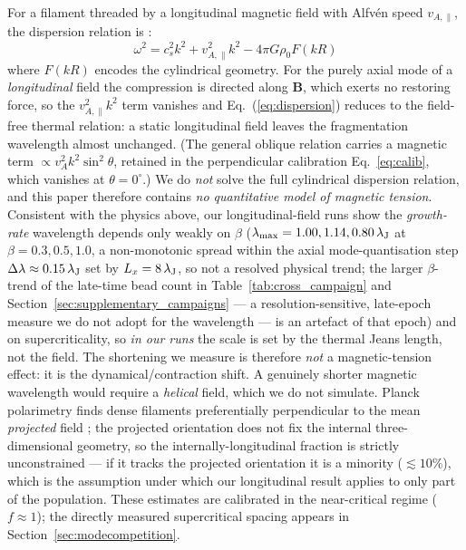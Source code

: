 \documentclass[usenatbib,twoside,twocolumn]{mnras}
\begin{document}
For a filament threaded by a longitudinal magnetic field with Alfv\'en speed $v_{A,\parallel}$, the dispersion relation is \citep{Nakamura1993}:
\begin{equation}
\omega^2 = c_s^2 k^2 + v_{A,\parallel}^2 k^2 - 4\pi G\rho_0 F(kR)
\label{eq:dispersion}
\end{equation}
where $F(kR)$ encodes the cylindrical geometry. For the purely axial mode of a \emph{longitudinal} field the compression is directed along $\mathbf{B}$, which exerts no restoring force, so the $v_{A,\parallel}^2k^2$ term vanishes and Eq.~(\ref{eq:dispersion}) reduces to the field-free thermal relation: a static longitudinal field leaves the fragmentation wavelength almost unchanged. (The general oblique relation carries a magnetic term $\propto v_A^2k^2\sin^2\theta$, retained in the perpendicular calibration Eq.~\ref{eq:calib}, which vanishes at $\theta=0^\circ$.) We do \emph{not} solve the full cylindrical dispersion relation, and this paper therefore contains \emph{no quantitative model of magnetic tension}. Consistent with the physics above, our longitudinal-field runs show the \emph{growth-rate} wavelength depends only weakly on $\beta$ ($\lambda_{\rm max}=1.00,1.14,0.80\,\lambda_{\rm J}$ at $\beta=0.3,0.5,1.0$, a non-monotonic spread within the axial mode-quantisation step $\Delta\lambda\approx0.15\,\lambda_{\rm J}$ set by $L_x=8\,\lambda_{\rm J}$, so not a resolved physical trend; the larger $\beta$-trend of the late-time bead count in Table~\ref{tab:cross_campaign} and Section~\ref{sec:supplementary_campaigns} --- a resolution-sensitive, late-epoch measure we do not adopt for the wavelength --- is an artefact of that epoch) and on supercriticality, so \emph{in our runs} the scale is set by the thermal Jeans length, not the field. The shortening we measure is therefore \emph{not} a magnetic-tension effect: it is the dynamical/contraction shift. A genuinely shorter magnetic wavelength would require a \emph{helical} field, which we do not simulate. Planck polarimetry finds dense filaments preferentially perpendicular to the mean \emph{projected} field \citep{Jadhav2026}; the projected orientation does not fix the internal three-dimensional geometry, so the internally-longitudinal fraction is strictly unconstrained --- if it tracks the projected orientation it is a minority ($\lesssim10\%$), which is the assumption under which our longitudinal result applies to only part of the population. These estimates are calibrated in the near-critical regime ($f\approx1$); the directly measured supercritical spacing appears in Section~\ref{sec:modecompetition}.
\end{document}
